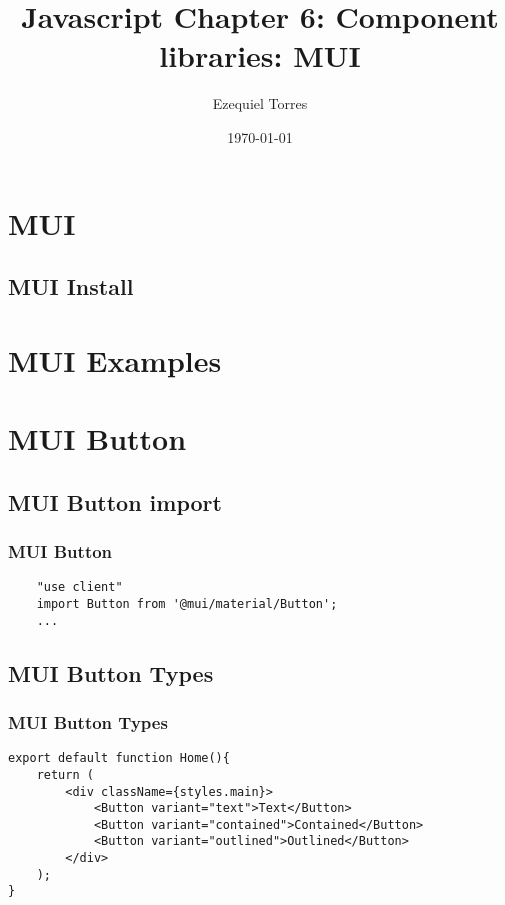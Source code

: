 \documentclass{beamer}
\begin{document}
\title{Javascript Chapter 6: Component libraries: MUI}
\author{Ezequiel Torres}
\date{\today}
\frame{\titlepage}

\section{MUI}

\subsection{MUI Install}

\section{MUI Examples}

\section{MUI Button}
\subsection{MUI Button import}
\begin{frame}[fragile]
\frametitle{MUI Button}
\begin{lstlisting}
    "use client"
    import Button from '@mui/material/Button';
    ...
\end{lstlisting}
\end{frame}

\fontsize{8pt}{8pt}\selectfont
\subsection{MUI Button Types}
\begin{frame}[fragile]
\frametitle{MUI Button Types}
\begin{lstlisting}
export default function Home(){
    return (
        <div className={styles.main}>
            <Button variant="text">Text</Button>
            <Button variant="contained">Contained</Button>
            <Button variant="outlined">Outlined</Button>
        </div>
    );
}
\end{lstlisting}
\end{frame}
\end{document}
